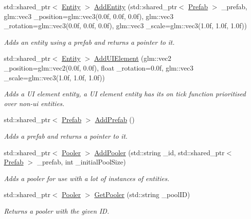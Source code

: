 \begin{DoxyCompactItemize}
std\+::shared\+\_\+ptr$<$ \hyperlink{classfrontier_1_1_entity}{Entity} $>$ \hyperlink{classfrontier_1_1_core_a87217c1aa2c91e76d006c0f3dfeba309}{Add\+Entity} (std\+::shared\+\_\+ptr$<$ \hyperlink{classfrontier_1_1_prefab}{Prefab} $>$ \+\_\+prefab, glm\+::vec3 \+\_\+position=glm\+::vec3(0.\+0f, 0.\+0f, 0.\+0f), glm\+::vec3 \+\_\+rotation=glm\+::vec3(0.\+0f, 0.\+0f, 0.\+0f), glm\+::vec3 \+\_\+scale=glm\+::vec3(1.\+0f, 1.\+0f, 1.\+0f))
\begin{DoxyCompactList}\small\item\em Adds an entity using a prefab and returns a pointer to it. \end{DoxyCompactList}\item 
std\+::shared\+\_\+ptr$<$ \hyperlink{classfrontier_1_1_entity}{Entity} $>$ \hyperlink{classfrontier_1_1_core_afa83f3a99653170b1f6f6e5661a2a5f5}{Add\+U\+I\+Element} (glm\+::vec2 \+\_\+position=glm\+::vec2(0.\+0f, 0.\+0f), float \+\_\+rotation=0.\+0f, glm\+::vec3 \+\_\+scale=glm\+::vec3(1.\+0f, 1.\+0f, 1.\+0f))
\begin{DoxyCompactList}\small\item\em Adds a UI element entity, a UI element entity has it\textquotesingle{}s on tick function prioritised over non-\/ui entities. \end{DoxyCompactList}\item 
std\+::shared\+\_\+ptr$<$ \hyperlink{classfrontier_1_1_prefab}{Prefab} $>$ \hyperlink{classfrontier_1_1_core_a5be4be857929a89eee24411504038c72}{Add\+Prefab} ()
\begin{DoxyCompactList}\small\item\em Adds a prefab and returns a pointer to it. \end{DoxyCompactList}\item 
std\+::shared\+\_\+ptr$<$ \hyperlink{classfrontier_1_1_pooler}{Pooler} $>$ \hyperlink{classfrontier_1_1_core_a75859114b2e1acae74a7ec0ab4175c14}{Add\+Pooler} (std\+::string \+\_\+id, std\+::shared\+\_\+ptr$<$ \hyperlink{classfrontier_1_1_prefab}{Prefab} $>$ \+\_\+prefab, int \+\_\+initial\+Pool\+Size)
\begin{DoxyCompactList}\small\item\em Adds a pooler for use with a lot of instances of entities. \end{DoxyCompactList}\item 
std\+::shared\+\_\+ptr$<$ \hyperlink{classfrontier_1_1_pooler}{Pooler} $>$ \hyperlink{classfrontier_1_1_core_a1ebe697a4700dfc8f3ba4749aa9bd854}{Get\+Pooler} (std\+::string \+\_\+pool\+ID)
\begin{DoxyCompactList}\small\item\em Returns a pooler with the given ID. \end{DoxyCompactList}\item 

\end{DoxyCompactItemize}
